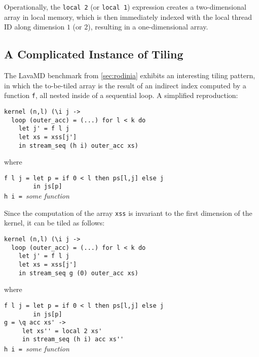 Operationally, the \lstinline{local 2} (or \lstinline{local 1})
expression creates a two-dimensional array in local memory, which is
then immediately indexed with the local thread ID along dimension $1$
(or $2$), resulting in a one-dimensional array.

\subsection{A Complicated Instance of Tiling}
\label{sec:lavamd-tiling}

The LavaMD benchmark from \cref{sec:rodinia} exhibits an interesting
tiling pattern, in which the to-be-tiled array is the result of an
indirect index computed by a function \texttt{f}, all nested inside of
a sequential loop.  A simplified reproduction:

\begin{lstlisting}[xleftmargin=0.5cm]
kernel (n,l) (\i j ->
  loop (outer_acc) = (...) for l < k do
    let j' = f l j
    let xs = xss[j']
    in stream_seq (h i) outer_acc xs)
\end{lstlisting}
\begin{minipage}[t]{0.1\linewidth}
  \begin{flushright}
    where
  \end{flushright}
\end{minipage}
\begin{minipage}[t]{0.8\linewidth}
\lstinline{f l j = let p = if 0 < l then ps[l,j] else j}\\
\lstinline{        in js[p]}\\
\lstinline{h i = }\textit{some function}
\end{minipage}
\vspace{1em}

Since the computation of the array \texttt{xss} is invariant to the
first dimension of the kernel, it can be tiled as follows:

\begin{lstlisting}[xleftmargin=0.5cm]
kernel (n,l) (\i j ->
  loop (outer_acc) = (...) for l < k do
    let j' = f l j
    let xs = xss[j']
    in stream_seq g (0) outer_acc xs)
\end{lstlisting}
\begin{minipage}[t]{0.1\linewidth}
  \begin{flushright}
    where
  \end{flushright}
\end{minipage}
\begin{minipage}[t]{0.8\linewidth}
\lstinline{f l j = let p = if 0 < l then ps[l,j] else j}\\
\lstinline{        in js[p]}\\
\lstinline{g = \q acc xs' ->}\\
\lstinline{     let xs'' = local 2 xs'}\\
\lstinline{     in stream_seq (h i) acc xs''}\\
\lstinline{h i = }\textit{some function}
\end{minipage}
\vspace{1em}

